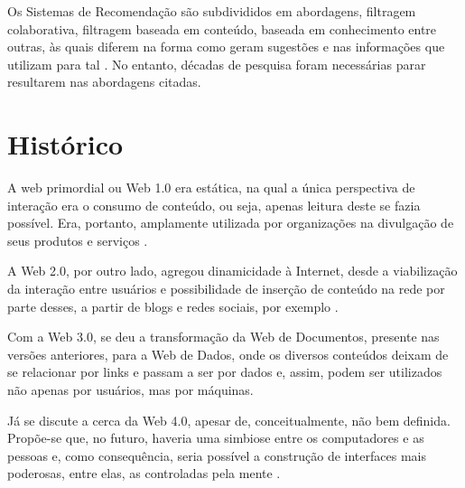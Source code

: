 Os Sistemas de Recomendação são subdivididos em abordagens, filtragem colaborativa, filtragem baseada em conteúdo, baseada em conhecimento entre outras, às quais diferem na forma como geram sugestões e nas informações que utilizam para tal \cite{Jannach2010}. No entanto, décadas de pesquisa foram necessárias parar resultarem nas abordagens citadas.

\section{Histórico}

A web primordial ou Web 1.0 era estática, na qual a única perspectiva de interação era o consumo de conteúdo, ou seja, apenas leitura deste se fazia possível. Era, portanto, amplamente utilizada por organizações na divulgação de seus produtos e serviços \cite{Aghaei2012}. 

A Web 2.0, por outro lado, agregou dinamicidade à Internet, desde a viabilização da interação entre usuários e possibilidade de inserção de conteúdo na rede por parte desses, a partir de blogs e redes sociais, por exemplo \cite{Nath2014}.

Com a Web 3.0, se deu a transformação da Web de Documentos, presente nas versões anteriores, para a Web de Dados, onde os diversos conteúdos deixam de se relacionar por links e passam a ser por dados e, assim, podem ser utilizados não apenas por usuários, mas por máquinas.
 

Já se discute a cerca da Web 4.0, apesar de, conceitualmente, não bem definida. Propõe-se que, no futuro, haveria uma simbiose entre os computadores e as pessoas e, como consequência, seria possível a construção de interfaces mais poderosas, entre elas, as controladas pela mente \cite{Aghaei2012}.

